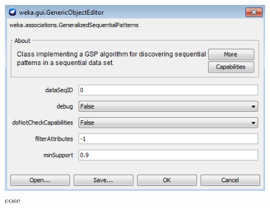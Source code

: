     \begin{figure}
        \centering
        \caption{cose}
        \label{gsp_weka}
        \includegraphics[scale=0.5]{img/gsp.png}
    \end{figure}